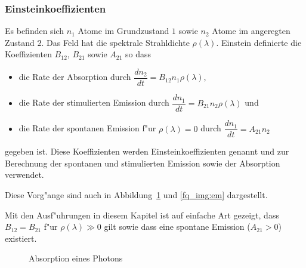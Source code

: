 \subsubsection{Einsteinkoeffizienten}
Es befinden sich $n_1$ Atome im Grundzustand $1$ sowie $n_2$ Atome im angeregten Zustand $2$. Das Feld hat die spektrale Strahldichte $\rho(\lambda)$. Einstein definierte die Koeffizienten $B_{12}$, $B_{21}$ sowie $A_{21}$ so dass
\begin{itemize}
	\item die Rate der Absorption durch $\dfrac{dn_2}{dt} = B_{12} n_1 \rho(\lambda)$,
	\item die Rate der stimulierten Emission durch $\dfrac{dn_1}{dt} = B_{21} n_2 \rho(\lambda)$ und
	\item die Rate der spontanen Emission f"ur $\rho(\lambda)=0$ durch $\dfrac{dn_1}{dt} = A_{21} n_2$
\end{itemize}
gegeben ist. Diese Koeffizienten werden Einsteinkoeffizienten \cite{fq:einstein_koeff} genannt und zur Berechnung der spontanen und stimulierten Emission sowie der Absorption verwendet.

Diese Vorg"ange sind auch in Abbildung~\ref{fq_img:abs} und \ref{fq_img:em} dargestellt.

Mit den Ausf"uhrungen in diesem Kapitel ist auf einfache Art gezeigt, dass $B_{12} = B_{21}$ f"ur $\rho(\lambda) \gg 0$ gilt sowie dass eine spontane Emission ($A_{21} > 0$) existiert.

\begin{figure}
	\centering
	\caption{Absorption eines Photons
		\label{fq_img:abs}}
\end{figure}

